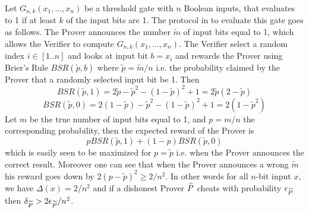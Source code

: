 Let $G_{n,k}(x_1,\ldots,x_n)$ be a threshold gate with $n$ Boolean inputs, that evaluates to 1 if at least $k$ of the input bits are 1. The protocol in \cite{am1} to evaluate this gate goes as follows. The Prover announces the number $\tilde{m}$ of input bits equal to 1, which allows the Verifier to compute $G_{n,k}(x_1,\ldots,x_n)$. The Verifier select a random index $i \in [1..n]$ and looks at input bit $b=x_i$ and rewards the Prover using Brier's Rule $BSR(\tilde{p},b)$ where $\tilde{p}=\tilde{m}/n$ i.e. the probability claimed by the Prover that a randomly selected input bit be 1. Then
\[BSR(\tilde{p},1) = 2\tilde{p} - \tilde{p}^2 - (1-\tilde{p})^2 + 1 = 2\tilde{p}(2-\tilde{p}) \]
\[BSR(\tilde{p},0) = 2(1-\tilde{p}) - \tilde{p}^2 - (1-\tilde{p})^2 +1 = 2(1-\tilde{p}^2) \]
Let $m$ be the true number of input bits equal to 1, and $p=m/n$ the corresponding probability, then the expected reward of the Prover is
\begin{equation}
\label{eq:bsr}
p BSR(\tilde{p},1) + (1-p) BSR(\tilde{p},0) 
\end{equation}
which is easily seen to be maximized for $p=\tilde{p}$ i.e. when the Prover announces the correct result. Moreover one can see that when the Prover announces a wrong $\tilde{m}$ his reward goes down by $2(p-\tilde{p})^2 \geq 2/n^2$. In other words 
for all $n$-bit input $x$, we have $\Delta(x)=2/n^2$ and if a dishonest Prover $\widetilde{P}$ cheats with probability $\epsilon_{\widetilde{P}}$ then $\delta_{\widetilde{P}} > 2\epsilon_{\widetilde{P}}/n^2$. 



